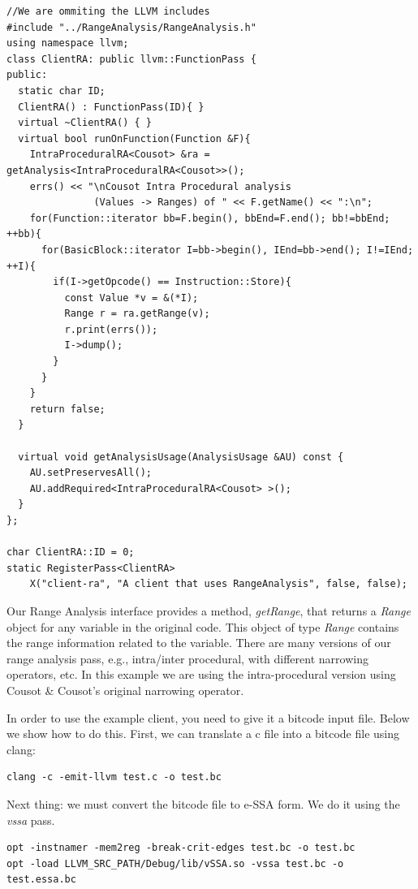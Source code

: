 \documentclass{paper}
\begin{document}
\begin{lstlisting}[frame=single]
//We are ommiting the LLVM includes
#include "../RangeAnalysis/RangeAnalysis.h"
using namespace llvm;
class ClientRA: public llvm::FunctionPass {
public:
  static char ID;
  ClientRA() : FunctionPass(ID){ }
  virtual ~ClientRA() { }
  virtual bool runOnFunction(Function &F){
    IntraProceduralRA<Cousot> &ra = getAnalysis<IntraProceduralRA<Cousot>>();
    errs() << "\nCousot Intra Procedural analysis 
               (Values -> Ranges) of " << F.getName() << ":\n";
    for(Function::iterator bb=F.begin(), bbEnd=F.end(); bb!=bbEnd; ++bb){
      for(BasicBlock::iterator I=bb->begin(), IEnd=bb->end(); I!=IEnd; ++I){
        if(I->getOpcode() == Instruction::Store){
          const Value *v = &(*I);
          Range r = ra.getRange(v);
          r.print(errs());
          I->dump();
        }
      }
    }
    return false;
  }

  virtual void getAnalysisUsage(AnalysisUsage &AU) const {
    AU.setPreservesAll();
    AU.addRequired<IntraProceduralRA<Cousot> >();
  }
};

char ClientRA::ID = 0;
static RegisterPass<ClientRA> 
	X("client-ra", "A client that uses RangeAnalysis", false, false);
\end{lstlisting}

Our Range Analysis interface provides a method, \textit{getRange}, that returns a \textit{Range} object for any variable in the original code. This object of type \textit{Range} contains the range information related to the variable. There are many versions of our range analysis pass, e.g., intra/inter procedural, with different narrowing operators, etc. In this example we are using the intra-procedural version using Cousot & Cousot's original narrowing operator.

In order to use the example client, you need to give it a bitcode input file. Below we show how to do this.
First, we can translate a c file into a bitcode file using clang:
\begin{lstlisting}[frame=single]
clang -c -emit-llvm test.c -o test.bc
\end{lstlisting}

Next thing: we must convert the bitcode file to e-SSA form. We do it using the \textit{vssa} pass.
\begin{lstlisting}[frame=single]
opt -instnamer -mem2reg -break-crit-edges test.bc -o test.bc
opt -load LLVM_SRC_PATH/Debug/lib/vSSA.so -vssa test.bc -o test.essa.bc
\end{lstlisting}
\end{document}
